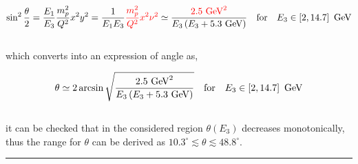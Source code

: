 \begin{solution}
\begin{enumerate}[label=(\alph*)]
            \begin{align*}
                \sin^2 \frac{\theta}{2} = \frac{E_1}{E_3} \frac{m_p^2}{Q^2} x^2 y^2 = \frac{1}{E_1E_3} {\color{red}\frac{m_p^2}{Q^2} x^2 \nu^2} \simeq \frac{\color{red} 2.5 \text{ GeV}^2}{E_3 \left( E_3 + 5.3 \text{ GeV} \right)}  \quad \text{for} \quad E_3 \in  \left[ 2,14.7 \right] \text{ GeV}
            \end{align*}\\
            which converts into an expression of angle as,

            \begin{align*}
                \theta \simeq 2 \arcsin \sqrt{\frac{2.5 \text{ GeV}^2}{E_3 \left( E_3 + 5.3 \text{ GeV} \right)}} \quad \text{for} \quad E_3 \in  \left[ 2,14.7 \right] \text{ GeV}
            \end{align*}\\
            it can be checked that in the considered region $\theta(E_3)$ decreases monotonically, thus the range for $\theta$ can be derived as $\boxed{  10.3^\circ \lesssim  \theta \lesssim  48.8^\circ }$.
    \end{enumerate}
\end{solution}

\noindent\rule{7in}{1.5pt}


